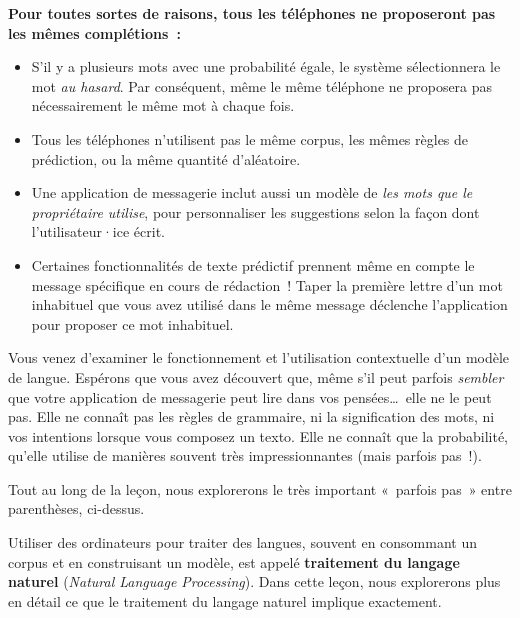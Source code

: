 \documentclass[12pt,a4paper]{article}
\begin{document}
\begin{keypointbox}
  \textbf{Pour toutes sortes de raisons, tous les téléphones ne proposeront pas les mêmes complétions~:}
  \begin{itemize}
    \item S'il y a plusieurs mots avec une probabilité égale, le système sélectionnera le mot \emph{au hasard}. Par conséquent, même le même téléphone ne proposera pas nécessairement le même mot à chaque fois.
    \item Tous les téléphones n'utilisent pas le même corpus, les mêmes règles de prédiction, ou la même quantité d'aléatoire.
    \item Une application de messagerie inclut aussi un modèle de \emph{les mots que le propriétaire utilise}, pour personnaliser les suggestions selon la façon dont l'utilisateur·ice écrit.
    \item Certaines fonctionnalités de texte prédictif prennent même en compte le message spécifique en cours de rédaction~! Taper la première lettre d'un mot inhabituel que vous avez utilisé dans le même message déclenche l'application pour proposer ce mot inhabituel.
  \end{itemize}
\end{keypointbox}

\begin{keypointbox}
  Vous venez d'examiner le fonctionnement et l'utilisation contextuelle d'un modèle de langue. Espérons que vous avez découvert que, même s'il peut parfois \emph{sembler} que votre application de messagerie peut lire dans vos pensées…~elle ne le peut pas. Elle ne connaît pas les règles de grammaire, ni la signification des mots, ni vos intentions lorsque vous composez un texto. Elle ne connaît que la probabilité, qu'elle utilise de manières souvent très impressionnantes (mais parfois pas~!).

  Tout au long de la leçon, nous explorerons le très important «~parfois pas~» entre parenthèses, ci-dessus.
\end{keypointbox}

\begin{keypointbox}
  Utiliser des ordinateurs pour traiter des langues, souvent en consommant un corpus et en construisant un modèle, est appelé \textbf{traitement du langage naturel} (\emph{Natural Language Processing}). Dans cette leçon, nous explorerons plus en détail ce que le traitement du langage naturel implique exactement.
\end{keypointbox}
\end{document}
